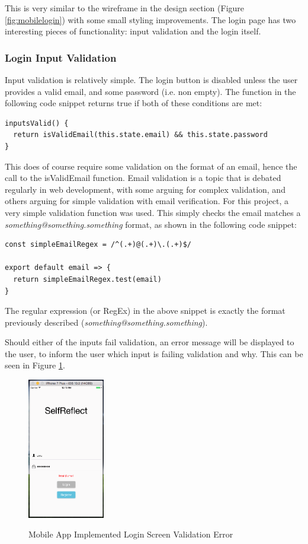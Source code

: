 \documentclass[11pt,openright,a4paper]{report}
\begin{document}
This is very similar to the wireframe in the design section (Figure \ref{fig:mobilelogin}) with some small styling improvements. The login page has two interesting pieces of functionality: input validation and the login itself.

\subsubsection{Login Input Validation}
Input validation is relatively simple. The login button is disabled unless the user provides a valid email, and some password (i.e. non empty). The function in the following code snippet returns true if both of these conditions are met:

\begin{lstlisting}
inputsValid() {
  return isValidEmail(this.state.email) && this.state.password
}
\end{lstlisting}

This does of course require some validation on the format of an email, hence the call to the isValidEmail function. Email validation is a topic that is debated regularly in web development, with some arguing for complex validation, and others arguing for simple validation with email verification. For this project, a very simple validation function was used. This simply checks the email matches a \emph{something@something.something} format, as shown in the following code snippet:

\begin{lstlisting}
const simpleEmailRegex = /^(.+)@(.+)\.(.+)$/

export default email => {
  return simpleEmailRegex.test(email)
}
\end{lstlisting}

The regular expression (or RegEx) in the above snippet is exactly the format previously described (\emph{something@something.something}).

Should either of the inputs fail validation, an error message will be displayed to the user, to inform the user which input is failing validation and why. This can be seen in Figure \ref{fig:mobileloginerror}.

\begin{figure}[ht]
\centering
\caption{Mobile App Implemented Login Screen Validation Error}
\includegraphics[width=0.3\textwidth]{i/mobileloginerror.png}
\label{fig:mobileloginerror}
\end{figure}
\end{document}
